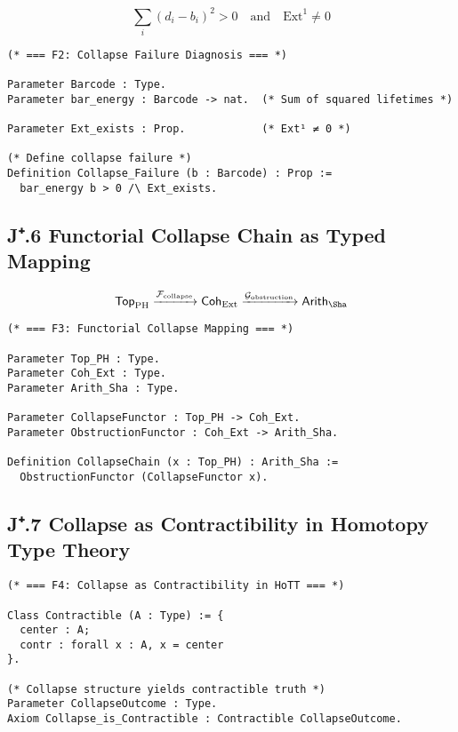 \[
\sum_i (d_i - b_i)^2 > 0 \quad \text{and} \quad \mathrm{Ext}^1 \neq 0
\]

\begin{lstlisting}[language=Coq, caption=Collapse Failure Zone as Type-Theoretic Predicate]
(* === F2: Collapse Failure Diagnosis === *)

Parameter Barcode : Type.
Parameter bar_energy : Barcode -> nat.  (* Sum of squared lifetimes *)

Parameter Ext_exists : Prop.            (* Ext¹ ≠ 0 *)

(* Define collapse failure *)
Definition Collapse_Failure (b : Barcode) : Prop :=
  bar_energy b > 0 /\ Ext_exists.
\end{lstlisting}

\subsection*{J⁺.6 Functorial Collapse Chain as Typed Mapping}

\[
\mathsf{Top}_{\mathrm{PH}} \xrightarrow{\mathcal{F}_{\mathrm{collapse}}}
\mathsf{Coh}_{\mathrm{Ext}} \xrightarrow{\mathcal{G}_{\mathrm{obstruction}}}
\mathsf{Arith}_{\Sha}
\]

\begin{lstlisting}[language=Coq, caption=Typed Functorial Collapse Chain]
(* === F3: Functorial Collapse Mapping === *)

Parameter Top_PH : Type.
Parameter Coh_Ext : Type.
Parameter Arith_Sha : Type.

Parameter CollapseFunctor : Top_PH -> Coh_Ext.
Parameter ObstructionFunctor : Coh_Ext -> Arith_Sha.

Definition CollapseChain (x : Top_PH) : Arith_Sha :=
  ObstructionFunctor (CollapseFunctor x).
\end{lstlisting}

\subsection*{J⁺.7 Collapse as Contractibility in Homotopy Type Theory}

\begin{lstlisting}[language=Coq, caption=Collapse Terminal State as Contractible Type]
(* === F4: Collapse as Contractibility in HoTT === *)

Class Contractible (A : Type) := {
  center : A;
  contr : forall x : A, x = center
}.

(* Collapse structure yields contractible truth *)
Parameter CollapseOutcome : Type.
Axiom Collapse_is_Contractible : Contractible CollapseOutcome.
\end{lstlisting}

